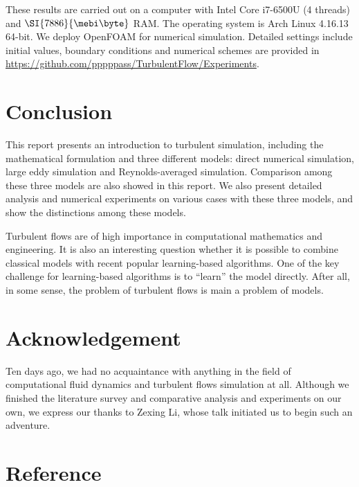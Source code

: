 \documentclass[english, nochinese]{pkupaper}
\begin{document}
These results are carried out on a computer with Intel Core i7-6500U (4 threads) and $\SI{7886}{\mebi\byte}$ RAM. The operating system is Arch Linux 4.16.13 64-bit. We deploy OpenFOAM \parencite{weller_tensorial_1998} for numerical simulation. Detailed settings include initial values, boundary conditions and numerical schemes are provided in \url{https://github.com/pppppass/TurbulentFlow/Experiments}.

\section{Conclusion} \label{Sec:Con}

This report presents an introduction to turbulent simulation, including the mathematical formulation and three different models: direct numerical simulation, large eddy simulation and Reynolds-averaged simulation. Comparison among these three models are also showed in this report. We also present detailed analysis and numerical experiments on various cases with these three models, and show the distinctions among these models.

Turbulent flows are of high importance in computational mathematics and engineering. It is also an interesting question whether it is possible to combine classical models with recent popular learning-based algorithms. One of the key challenge for learning-based algorithms is to ``learn'' the model directly. After all, in some sense, the problem of turbulent flows is main a problem of models.

\section{Acknowledgement} \label{Sec:Ack}

Ten days ago, we had no acquaintance with anything in the field of computational fluid dynamics and turbulent flows simulation at all. Although we finished the literature survey and comparative analysis and experiments on our own, we express our thanks to Zexing Li, whose talk initiated us to begin such an adventure.

\section{Reference}

\printbibliography
\end{document}
